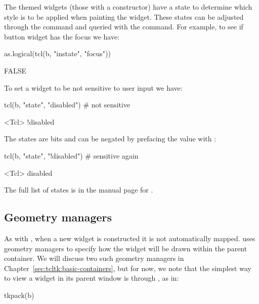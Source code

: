 The themed widgets (those with a  constructor) have a state
to determine which style is to be applied when painting the
widget. These states can be adjusted through the  command
and queried with the  command. For example, to see if
button widget  has the focus we have:
\begin{Schunk}
\begin{Sinput}
 as.logical(tcl(b, "instate", "focus"))
\end{Sinput}
\begin{Soutput}
[1] FALSE
\end{Soutput}
\end{Schunk}
To set a widget to be not sensitive to user input we have:
\begin{Schunk}
\begin{Sinput}
 tcl(b, "state", "disabled")             # not sensitive
\end{Sinput}
\begin{Soutput}
<Tcl> !disabled 
\end{Soutput}
\end{Schunk}
The states are bits and can be negated by prefacing the value with \code{!}:
\begin{Schunk}
\begin{Sinput}
 tcl(b, "state", "!disabled")            # sensitive again
\end{Sinput}
\begin{Soutput}
<Tcl> disabled 
\end{Soutput}
\end{Schunk}

The full list of states is in the manual page for .

\subsection{Geometry managers}
\label{sec:tcltk:overview:geometry-managers}

As with \Qt, when a new widget is constructed it is not automatically
mapped. \TK\/ uses geometry managers to specify how the widget will be
drawn within the parent container. We will discuss two such geometry
managers in Chapter~\ref{sec:tcltk:basic-containers}, but for now, we note
that the simplest way to view a widget in its parent window is through
, as in:
\begin{Schunk}
\begin{Sinput}
 tkpack(b)
\end{Sinput}
\end{Schunk}

